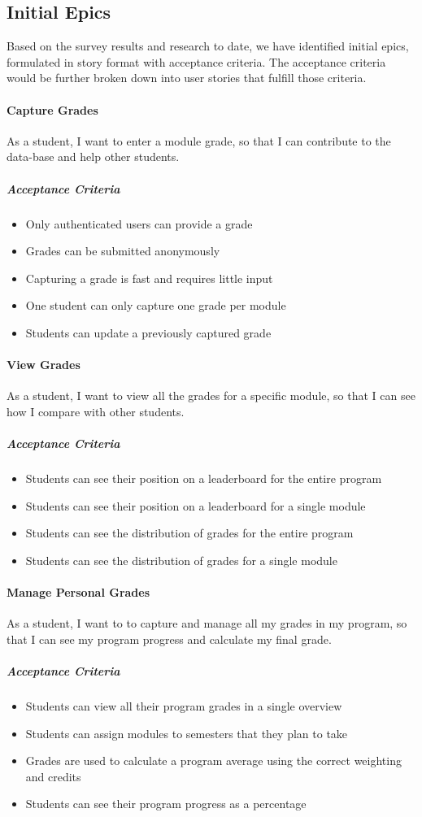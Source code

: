 \subsection{Initial Epics}
Based on the survey results and research to date, we have identified initial epics, formulated in story format with acceptance criteria. The acceptance criteria would be further broken down into user stories that fulfill those criteria.

\paragraph{Capture Grades} As a student, I want to enter a  module  grade,   so  that  I can  contribute  to  the  data-base and help other students.
\subparagraph{Acceptance Criteria}
\begin{itemize}
    \item Only authenticated users can provide a grade
    \item Grades can be submitted anonymously
    \item Capturing a grade is fast and requires little input
    \item One student can only capture one grade per module
    \item Students can update a previously captured grade
\end{itemize}

\paragraph{View Grades} As a student, I want to view all the grades for a specific module, so that I can see how I compare with other students.
\subparagraph{Acceptance Criteria}
\begin{itemize}
    \item Students can see their position on a leaderboard for the entire program
    \item Students can see their position on a leaderboard for a single module
    \item Students can see the distribution of grades for the entire program
    \item Students can see the distribution of grades for a single module
\end{itemize}


\paragraph{Manage Personal Grades} As a student, I want to to capture and manage all my grades in my program, so that I can see my program progress and calculate my final grade.
\subparagraph{Acceptance Criteria}
\begin{itemize}
    \item Students can view all their program grades in a single overview
    \item Students can assign modules to semesters that they plan to take
    \item Grades are used to calculate a program average using the correct weighting and credits
    \item Students can see their program progress as a percentage
\end{itemize}

